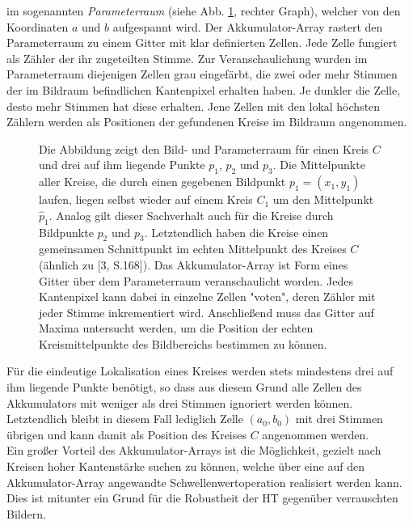 \documentclass[accentcolor=tud1c, 11pt, toc=bib, toc=listof, captions=abovetable, parskip=half]{tudreport}
\begin{document}
im sogenannten \textit{Parameterraum} (siehe Abb. \ref{fig:hough}, rechter Graph), welcher von den Koordinaten $a$ und $b$ aufgespannt wird. Der Akkumulator-Array rastert den Parameterraum zu einem Gitter mit klar definierten Zellen. Jede Zelle fungiert als Zähler der ihr zugeteilten Stimme. Zur Veranschaulichung wurden im Parameterraum diejenigen Zellen grau eingefärbt, die zwei oder mehr Stimmen der im Bildraum befindlichen Kantenpixel erhalten haben. Je dunkler die Zelle, desto mehr Stimmen hat diese erhalten. Jene Zellen mit den lokal höchsten Zählern werden als Positionen der gefundenen Kreise im Bildraum angenommen. \\

\begin{figure}
	\centering
	
	\caption{Die Abbildung zeigt den Bild- und Parameterraum für einen Kreis $C$ und drei auf ihm liegende Punkte $p_1$, $p_2$ und $p_3$. Die Mittelpunkte aller Kreise, die durch einen gegebenen Bildpunkt $p_1 = (x_1,y_1)$ laufen, liegen selbst wieder auf einem Kreis $C_1$ um den Mittelpunkt $\hat{p}_1$. Analog gilt dieser Sachverhalt auch für die Kreise durch Bildpunkte $p_2$ und $p_3$. Letztendlich haben die Kreise einen gemeinsamen Schnittpunkt im echten Mittelpunkt des Kreises $C$ (ähnlich zu [3, S.168]). Das Akkumulator-Array ist Form eines Gitter über dem Parameterraum veranschaulicht worden. Jedes Kantenpixel kann dabei in einzelne Zellen "voten", deren Zähler mit jeder Stimme inkrementiert wird. Anschließend muss das Gitter auf Maxima untersucht werden, um die Position der echten Kreismittelpunkte des Bildbereichs bestimmen zu können.}
\label{fig:hough} 
\end{figure} 

Für die eindeutige Lokalisation eines Kreises werden stets mindestens drei auf ihm liegende Punkte benötigt, so dass aus diesem Grund alle Zellen des Akkumulators mit weniger als drei Stimmen ignoriert werden können. Letztendlich bleibt in diesem Fall lediglich Zelle $(a_0,b_0)$ mit drei Stimmen übrigen und kann damit als Position des Kreises $C$ angenommen werden.\\

Ein großer Vorteil des Akkumulator-Arrays ist die Möglichkeit, gezielt nach Kreisen hoher Kantenstärke suchen zu können, welche über eine auf den Akkumulator-Array angewandte Schwellenwertoperation realisiert werden kann. Dies ist mitunter ein Grund für die Robustheit der HT gegenüber verrauschten Bildern.
\end{document}
